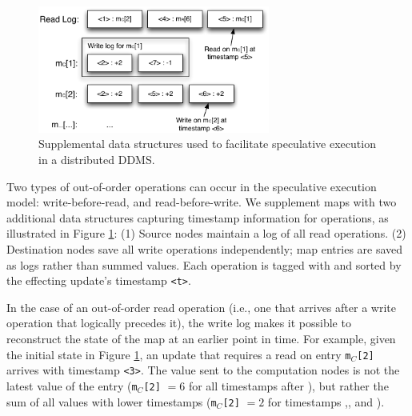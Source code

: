 
\begin{figure}
\begin{center}
\includegraphics[width=3.0in]{graphics/speculative_storage}
\end{center}
\caption{Supplemental data structures used to facilitate speculative execution in a distributed DDMS.}
\label{fig:speculativeStorage}
\vspace{-3mm}
\end{figure}

Two types of out-of-order operations can occur in the speculative execution 
model: write-before-read, and
read-before-write.  We supplement maps with two additional data structures
capturing timestamp information for operations, as illustrated in Figure
\ref{fig:speculativeStorage}: (1) Source nodes maintain a log of all read
operations.  (2) Destination nodes save all write operations independently; map
entries are saved as logs rather than summed values.  Each operation is tagged
with and sorted by the effecting update's timestamp \texttt{<t>}.

In the case of an out-of-order read operation (i.e., one that arrives after a
write operation that logically precedes it), the write log makes it possible to
reconstruct the state of the map at an earlier point in time.
For example, given the initial state in Figure \ref{fig:speculativeStorage}, an
update that requires a read on entry \texttt{m$_C$[2]} arrives with timestamp
\texttt{<3>}.  The value sent to the computation nodes is not the latest value
of the entry ({\tt m$_C$[2]} $ = 6$ for all timestamps after {\tt <6>}), but
rather the sum of all values with lower timestamps ({\tt m$_C$[2]} $ = 2$ for
timestamps {\tt <3>},{\tt <4>}, and {\tt <5>}).

